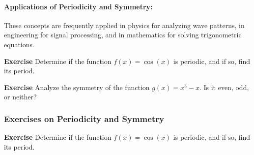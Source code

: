 \documentclass[a4paper,12pt]{book}
\newenvironment{exercise}[1][]
  {\par\medskip\noindent\textbf{Exercise #1} \rmfamily}
  {\medskip}
\begin{document}


\paragraph{Applications of Periodicity and Symmetry:}
These concepts are frequently applied in physics for analyzing wave patterns, in engineering for signal processing, and in mathematics for solving trigonometric equations.

\begin{exercise}
Determine if the function \( f(x) = \cos(x) \) is periodic, and if so, find its period.
\end{exercise}

\begin{exercise}
Analyze the symmetry of the function \( g(x) = x^3 - x \). Is it even, odd, or neither?
\end{exercise}

\subsubsection*{Exercises on Periodicity and Symmetry}

\begin{exercise}
Determine if the function \( f(x) = \cos(x) \) is periodic, and if so, find its period.
\end{exercise}
\end{document}
